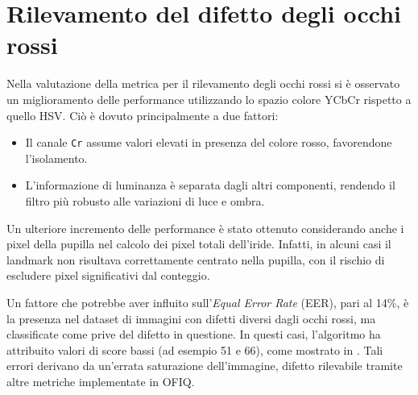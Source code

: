 \documentclass[12pt,a4paper,openright,twoside]{book}
\begin{document}
\section{Rilevamento del difetto degli occhi rossi}
Nella valutazione della metrica per il rilevamento degli occhi rossi si è osservato un miglioramento delle performance utilizzando lo spazio colore YCbCr rispetto a quello HSV.  
Ciò è dovuto principalmente a due fattori:
\begin{itemize}
    \item Il canale \texttt{Cr} assume valori elevati in presenza del colore rosso, favorendone l'isolamento.
    \item L'informazione di luminanza è separata dagli altri componenti, rendendo il filtro più robusto alle variazioni di luce e ombra.
\end{itemize}

Un ulteriore incremento delle performance è stato ottenuto considerando anche i pixel della pupilla nel calcolo dei pixel totali dell'iride. Infatti, in alcuni casi il landmark non risultava correttamente centrato nella pupilla, con il rischio di escludere pixel significativi dal conteggio.

Un fattore che potrebbe aver influito sull'\textit{Equal Error Rate} (EER), pari al 14\%, è la presenza nel dataset di immagini con difetti diversi dagli occhi rossi, ma classificate come prive del difetto in questione. In questi casi, l'algoritmo ha attribuito valori di score bassi (ad esempio 51 e 66), come mostrato in . Tali errori derivano da un'errata saturazione dell'immagine, difetto rilevabile tramite altre metriche implementate in OFIQ.
\end{document}
